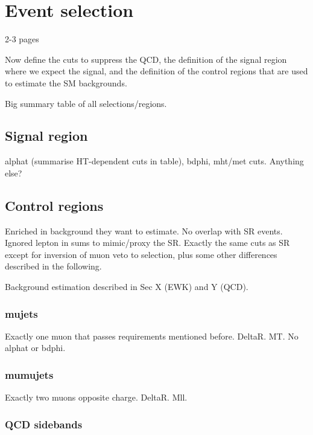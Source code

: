 \section{Event selection}
2-3 pages

Now define the cuts to suppress the QCD, the definition of the signal region 
where we expect the signal, and the definition of the control regions that are 
used to estimate the SM backgrounds.

Big summary table of all selections/regions.

\subsection{Signal region}

alphat (summarise HT-dependent cuts in table), bdphi, mht/met cuts.
Anything else?

\subsection{Control regions}

Enriched in background they want to estimate. No overlap with SR events. 
Ignored lepton in sums to mimic/proxy the SR. Exactly the same cuts as SR 
except for inversion of muon veto to selection, plus some other differences 
described in the following.

Background estimation described in Sec X (EWK) and Y (QCD).

\subsubsection{mujets}

Exactly one muon that passes requirements mentioned before. DeltaR. MT. No 
alphat or bdphi.

\subsubsection{mumujets}

Exactly two muons opposite charge. DeltaR. Mll.


\subsubsection{QCD sidebands} %

